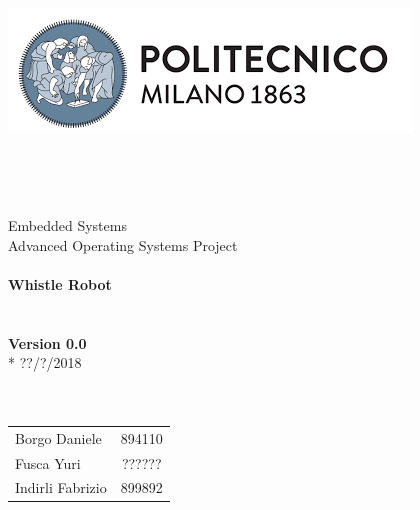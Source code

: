 \begin{titlepage}
	\begin{center}
		\includegraphics[scale=0.5]{files/images/PolimiLogo}
		\ \\ \ \\ \ \\ \ \\ \ \\
		\huge Embedded Systems \\
		\huge Advanced Operating Systems Project
		\ \\ \ \\
		\textbf{Whistle Robot}
		\ \\ \ \\ \ \\
		\textbf{Version 0.0}\\*
		??/?/2018
		\ \\ \ \\ \ \\
		\begin{tabular}{ l c }
			Borgo Daniele & 894110\\
			Fusca Yuri & ?????? \\
			Indirli Fabrizio & 899892 \\
		\end{tabular}
	\end{center}
\end{titlepage}